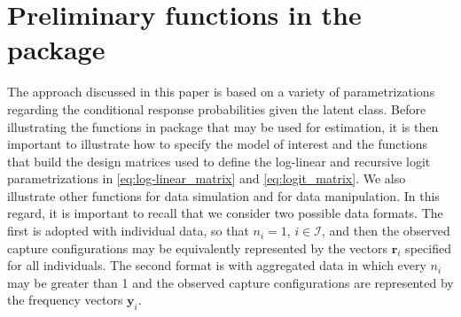 \section{Preliminary functions in the package}
%
The approach discussed in this paper is based on a variety of parametrizations regarding the conditional response probabilities given the latent class.
Before illustrating the functions in package  that may be used for estimation, it is then important to illustrate how to specify the model of interest and the functions that build the design matrices used to define the log-linear and recursive logit parametrizations in \eqref{eq:log-linear_matrix} and \eqref{eq:logit_matrix}.
We also illustrate other functions for data simulation and for data manipulation.
In this regard, it is important to recall that we consider two possible data formats.
The first is adopted with individual data, so that $n_i=1$, $i\in\mathcal{I}$, and then the observed capture configurations may be equivalently represented by the vectors $\bm{r}_i$ specified for all individuals.
The second format is with aggregated data in which every $n_i$ may be greater than 1 and the observed capture configurations are represented by the frequency vectors $\bm{y}_i$.
%
